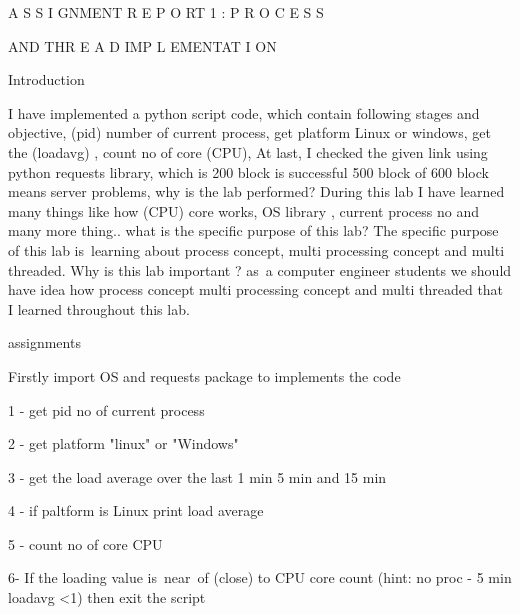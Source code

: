 \documentclass[12pt]{article}
\renewcommand{\_}{\kern-1.5pt\textunderscore\kern-1.5pt}
\begin{document}
\setlength{\parskip}{0.0pt}
\begin{justify}
{\fontsize{17pt}{20.4pt}\selectfont A S S I GNMENT R E P O RT 1 : P R O C E S S\par}
\end{justify}\par

\setlength{\parskip}{9.96pt}
\begin{justify}
{\fontsize{17pt}{20.4pt}\selectfont AND THR E A D IMP L EMENTAT I ON\par}
\end{justify}\par


\vspace{\baselineskip}

\vspace{\baselineskip}
Introduction\par

 I have implemented a python script code, which contain following stages and objective, (pid) number of current process, get platform Linux or windows, get the (loadavg) , count no of core (CPU), At last, I checked the given link using python requests library, which is 200 block is successful 500 block of 600 block means server problems, why is the lab performed? During this lab I have learned many things like how (CPU) core works, OS library , current process no and many more thing.. what is the specific purpose of this lab? The specific purpose of this lab is\  learning about process concept, multi processing concept and multi threaded. Why is this lab important ? as\ a computer engineer  students we should have idea how process concept multi processing concept and multi threaded that I learned throughout this lab.\par


\vspace{\baselineskip}
 assignments\par

Firstly import OS and requests package to implements the code \par

1 - get pid no of current process\par

2 - get platform "linux" or "Windows" \par

3 - get the load average over the last 1 min 5 min and 15 min\par

4 - if paltform is Linux print load average \par

5 - count no of core CPU\par

6- If the loading value is\  near\ of (close) to  CPU core count (hint: no proc - 5 min loadavg <1) then exit the script\par




\newpage

\vspace{\baselineskip}\par


\printbibliography
\end{document}
